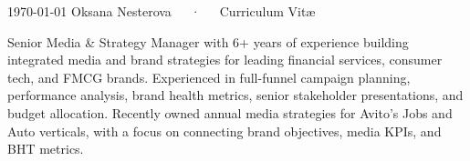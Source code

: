 \documentclass[11pt, a4paper]{awesome-cv}
\begin{document}
\makecvheader[C]

\makecvfooter
  {\today}
  {Oksana Nesterova~~~·~~~Curriculum Vitæ}
  {\thepage}


%
%
%
%
%
%
%
%


\begin{cvparagraph}
	Senior Media \& Strategy Manager with 6+ years of experience building integrated media and brand strategies for leading financial services, consumer tech, and FMCG brands. Experienced in full-funnel campaign planning, performance analysis, brand health metrics, senior stakeholder presentations, and budget allocation. Recently owned annual media strategies for Avito’s Jobs and Auto verticals, with a focus on connecting brand objectives, media KPIs, and BHT metrics.
\end{cvparagraph}
\end{document}
